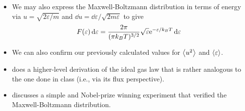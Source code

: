 \documentclass[../notes.tex]{subfiles}
\begin{document}
\begin{itemize}
\begin{itemize}
    \end{itemize}
    \item We may also express the Maxwell-Boltzmann distribution in terms of energy via $u=\sqrt{2\varepsilon/m}$ and $\dd{u}=\dd{\varepsilon}/\sqrt{2m\varepsilon}$ to give
    \begin{equation*}
        F(\varepsilon)\dd{\varepsilon} = \frac{2\pi}{(\pi k_BT)^{3/2}}\sqrt{\varepsilon}\e[-\varepsilon/k_BT]\dd{\varepsilon}
    \end{equation*}
    \item We can also confirm our previously calculated values for $\prb{u^2}$ and $\prb{\varepsilon}$.
    \item \textcite{bib:McQuarrieSimon} does a higher-level derivation of the ideal gas law that is rather analogous to the one done in class (i.e., via its flux perspective).
    \item \textcite{bib:McQuarrieSimon} discusses a simple and Nobel-prize winning experiment that verified the Maxwell-Boltzmann distribution.
\end{itemize}
\end{document}
